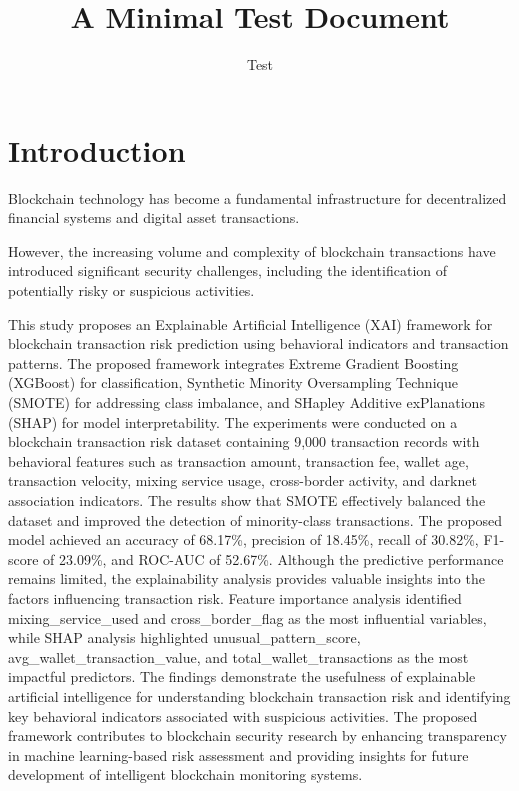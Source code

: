 \documentclass{article}
\title{A Minimal Test Document}
\author{Test}
\begin{document}
\maketitle

\section{Introduction}
Blockchain technology has become a fundamental infrastructure for decentralized financial systems and digital asset transactions.

However, the increasing volume and complexity of blockchain transactions have introduced significant security challenges, including the identification of potentially risky or suspicious activities.

This study proposes an Explainable Artificial Intelligence (XAI) framework for blockchain transaction risk prediction using behavioral indicators and transaction patterns.
The proposed framework integrates Extreme Gradient Boosting (XGBoost) for classification, Synthetic Minority Oversampling Technique (SMOTE) for addressing class imbalance, and SHapley Additive exPlanations (SHAP) for model interpretability.
The experiments were conducted on a blockchain transaction risk dataset containing 9,000 transaction records with behavioral features such as transaction amount, transaction fee, wallet age, transaction velocity, mixing service usage, cross-border activity, and darknet association indicators.
The results show that SMOTE effectively balanced the dataset and improved the detection of minority-class transactions. The proposed model achieved an accuracy of 68.17\%, precision of 18.45\%, recall of 30.82\%, F1-score of 23.09\%, and ROC-AUC of 52.67\%. Although the predictive performance remains limited, the explainability analysis provides valuable insights into the factors influencing transaction risk.
Feature importance analysis identified mixing_service_used and cross_border_flag as the most influential variables, while SHAP analysis highlighted unusual_pattern_score, avg_wallet_transaction_value, and total_wallet_transactions as the most impactful predictors.
The findings demonstrate the usefulness of explainable artificial intelligence for understanding blockchain transaction risk and identifying key behavioral indicators associated with suspicious activities.
The proposed framework contributes to blockchain security research by enhancing transparency in machine learning-based risk assessment and providing insights for future development of intelligent blockchain monitoring systems.
\end{document}
